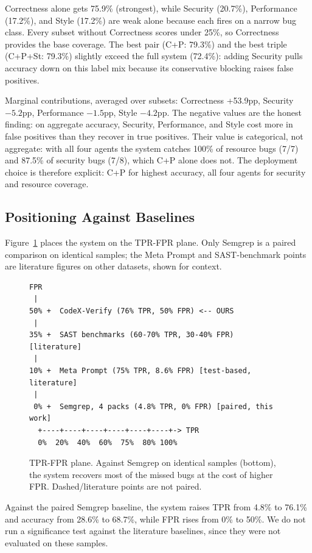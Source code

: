 \documentclass[10pt,twocolumn]{article}
\begin{document}
Correctness alone gets 75.9\% (strongest), while Security (20.7\%), Performance (17.2\%), and Style (17.2\%) are weak alone because each fires on a narrow bug class. Every subset without Correctness scores under 25\%, so Correctness provides the base coverage. The best pair (C+P: 79.3\%) and the best triple (C+P+St: 79.3\%) slightly exceed the full system (72.4\%): adding Security pulls accuracy down on this label mix because its conservative blocking raises false positives.

Marginal contributions, averaged over subsets: Correctness +53.9pp, Security $-5.2$pp, Performance $-1.5$pp, Style $-4.2$pp. The negative values are the honest finding: on aggregate accuracy, Security, Performance, and Style cost more in false positives than they recover in true positives. Their value is categorical, not aggregate: with all four agents the system catches 100\% of resource bugs (7/7) and 87.5\% of security bugs (7/8), which C+P alone does not. The deployment choice is therefore explicit: C+P for highest accuracy, all four agents for security and resource coverage.

\subsection{Positioning Against Baselines}

Figure~\ref{fig:comparison} places the system on the TPR-FPR plane. Only Semgrep is a paired comparison on identical samples; the Meta Prompt and SAST-benchmark points are literature figures on other datasets, shown for context.

\begin{figure}[t]
\centering
\footnotesize
\begin{verbatim}
FPR
 |
50% +  CodeX-Verify (76% TPR, 50% FPR) <-- OURS
 |
35% +  SAST benchmarks (60-70% TPR, 30-40% FPR) [literature]
 |
10% +  Meta Prompt (75% TPR, 8.6% FPR) [test-based, literature]
 |
 0% +  Semgrep, 4 packs (4.8% TPR, 0% FPR) [paired, this work]
  +----+----+----+----+----+----+-> TPR
  0%  20%  40%  60%  75%  80% 100%
\end{verbatim}
\caption{TPR-FPR plane. Against Semgrep on identical samples (bottom), the system recovers most of the missed bugs at the cost of higher FPR. Dashed/literature points are not paired.}
\label{fig:comparison}
\end{figure}

Against the paired Semgrep baseline, the system raises TPR from 4.8\% to 76.1\% and accuracy from 28.6\% to 68.7\%, while FPR rises from 0\% to 50\%. We do not run a significance test against the literature baselines, since they were not evaluated on these samples.
\end{document}
